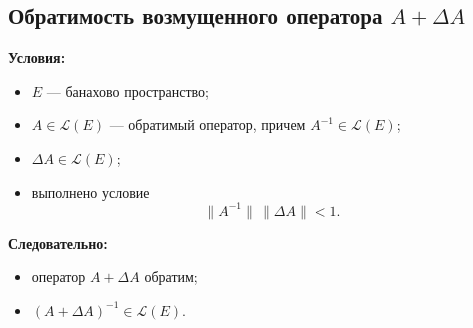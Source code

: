 \subsection{Обратимость возмущенного оператора \(A+\Delta A\)}

\begin{theorem}
	\textbf{Условия:}
	\begin{itemize}
		\item $E$ --- банахово пространство;
		\item $A \in \mathcal{L}(E)$ --- обратимый оператор, причем
		$A^{-1} \in \mathcal{L}(E)$;
		\item $\Delta A \in \mathcal{L}(E)$;
		\item выполнено условие
		\[
		\|A^{-1}\|\,\|\Delta A\| < 1.
		\]
	\end{itemize}
	
	\textbf{Следовательно:}
	\begin{itemize}
		\item оператор $A+\Delta A$ обратим;
		\item $(A+\Delta A)^{-1} \in \mathcal{L}(E)$.
	\end{itemize}
\end{theorem}

